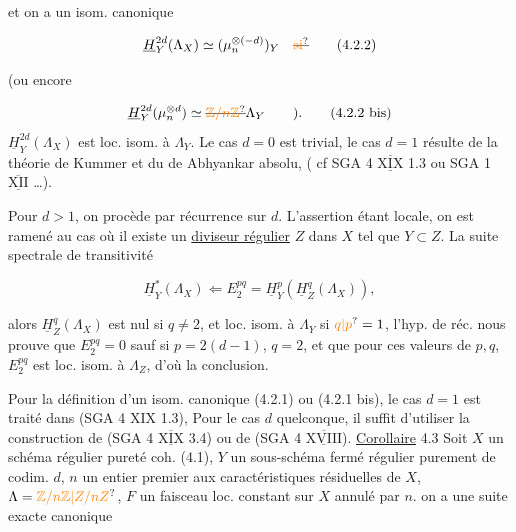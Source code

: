 et on a un isom. canonique

\[
\underline H^{2d}_Y(\Lambda_X)\simeq(\mu_n^{\otimes(-d)})_Y\quad\deleted{\unsure{\text{si}}}
\tag*{(4.2.2)}
\]

(ou encore

\[
\underline H^{2d}_Y(\mu_n^{\otimes d})\simeq\deleted{\unsure{\mathbb Z/n\mathbb Z}}\Lambda_Y\qquad).
\tag*{(4.2.2 bis)}
\]
     $\underline H^{2d}_Y(\Lambda_X)$ est loc. isom. à $\Lambda_Y$.  Le cas $d=0$ est trivial, le cas $d=1$ résulte de la théorie de Kummer et du  de Abhyankar absolu,   ( cf SGA 4 $\overline{\underline{\mathrm{XIX}}}$ 1.3 ou SGA 1 $\overline{\underline{\mathrm{XII}}}$ \ldots).

Pour $d>1$, on procède par récurrence sur $d$. L'assertion étant locale, on  est ramené au cas où il existe un \uline{diviseur régulier} $Z$ dans $X$ tel que  $Y\subset Z$.   La suite spectrale de transitivité

\[
\underline H^*_Y(\Lambda_X)\Longleftarrow E^{pq}_2=\underline H^p_Y(\underline H^q_Z(\Lambda_X)),
\]

 alors  $\underline H^q_Z(\Lambda_X)$ est nul si $q\ne 2$, et loc. isom. à $\Lambda_Y$ si $\unsure{q|p}=1$,  l'hyp. de réc. nous prouve que $E^{pq}_2=0$ sauf  si  $p=2(d-1)$, $q=2$, et que pour ces valeurs de $p,q$, $E^{pq}_2$ est loc. isom. à $\Lambda_Z$, d'où la conclusion.

Pour la définition d'un isom. canonique (4.2.1) ou (4.2.1 bis), le cas $d=1$ est traité dans (SGA 4 XIX 1.3),  Pour le cas $d$ quelconque, il suffit d'utiliser la construction de (SGA 4 $\overline{\underline{\mathrm{XIX}}}$ 3.4) ou de (SGA 4 $\overline{\underline{\mathrm{XVIII}}}$\quad).
\uline{Corollaire} 4.3 Soit $X$ un schéma  régulier   pureté coh. (4.1), $Y$ un sous-schéma fermé régulier purement de codim. $d$, $n$ un entier premier aux caractéristiques résiduelles de $X$, $\Lambda=\unsure{\mathbb Z/n\mathbb Z|Z/nZ}$, $F$ un faisceau loc. constant sur $X$ annulé par $n$.
 on a une suite exacte canonique


